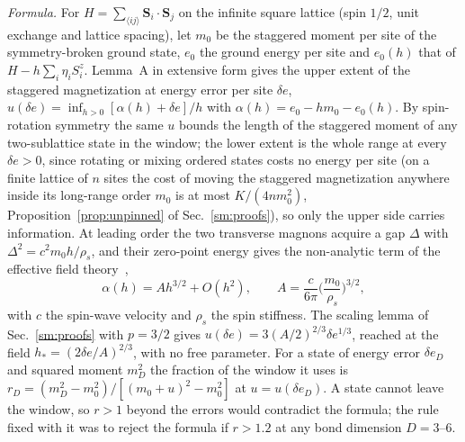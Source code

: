 \documentclass[aps,prx,onecolumn,10pt,nofootinbib,longbibliography,floatfix]{revtex4-2}
\theoremstyle{remark}
\newcommand{\de}{\delta e}
\begin{document}
\emph{Formula.} For $H=\sum_{\langle ij\rangle}\bm S_i\cdot\bm S_j$ on the infinite square lattice (spin $1/2$, unit
exchange and lattice spacing), let $m_0$ be the staggered moment per site of the symmetry-broken ground state, $e_0$ the
ground energy per site and $e_0(h)$ that of $H-h\sum_i\eta_iS_i^z$. Lemma~A in extensive form gives the upper extent of
the staggered magnetization at energy error per site $\de$, $u(\de)=\inf_{h>0}[\alpha(h)+\de]/h$ with
$\alpha(h)=e_0-hm_0-e_0(h)$. By spin-rotation symmetry the same $u$ bounds the length of the staggered moment of any
two-sublattice state in the window; the lower extent is the whole range at every $\de>0$, since rotating or mixing
ordered states costs no energy per site (on a finite lattice of $n$ sites the cost of moving the staggered
magnetization anywhere inside its long-range order $m_0$ is at most $K/(4nm_0^2)$, Proposition~\ref{prop:unpinned}
of Sec.~\ref{sm:proofs}), so only the upper side carries information. At leading order the two
transverse magnons acquire a gap $\Delta$ with $\Delta^2=c^2m_0h/\rho_s$, and their zero-point energy gives the
non-analytic term of the effective field theory~\cite{hofmann2020},
\begin{equation}
\alpha(h)=Ah^{3/2}+O(h^2),\qquad A=\frac{c}{6\pi}\Big(\frac{m_0}{\rho_s}\Big)^{3/2}, %
\end{equation}
with $c$ the spin-wave velocity and $\rho_s$ the spin stiffness. The scaling lemma of Sec.~\ref{sm:proofs} with $p=3/2$
gives $u(\de)=3(A/2)^{2/3}\de^{1/3}$, reached at the field $h_*=(2\de/A)^{2/3}$, with no free parameter. For a state of
energy error $\de_D$ and squared moment $m_D^2$ the fraction of the window it uses is
$r_D=(m_D^2-m_0^2)/[(m_0+u)^2-m_0^2]$ at $u=u(\de_D)$. A state cannot leave the window, so $r>1$ beyond the errors would
contradict the formula; the rule fixed with it was to reject the formula if $r>1.2$ at any bond dimension $D=3$--$6$. %
\end{document}

